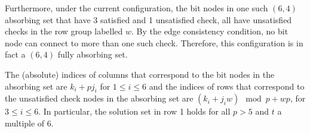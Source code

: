 Furthermore, under the current configuration, the bit nodes in one
such $(6,4)$ absorbing set that have 3 satisfied and 1 unsatisfied
check, all have unsatisfied checks in the row group labelled $w$.
By the edge consistency condition, no bit node can connect to more
than one such check. Therefore, this configuration is in fact a
$(6,4)$ fully absorbing set.

The (absolute) indices of columns that correspond to the bit nodes
in the absorbing set are $k_i+pj_i$ for $1 \leq i \leq 6$ and the
indices of rows that correspond to the unsatisfied check nodes in
the absorbing set are $(k_i+j_iw) \mod p+ wp$, for $3\leq i \leq
6$. In particular, the solution set in row 1 holds for all $p > 5$
and $t$ a multiple of $6$.

